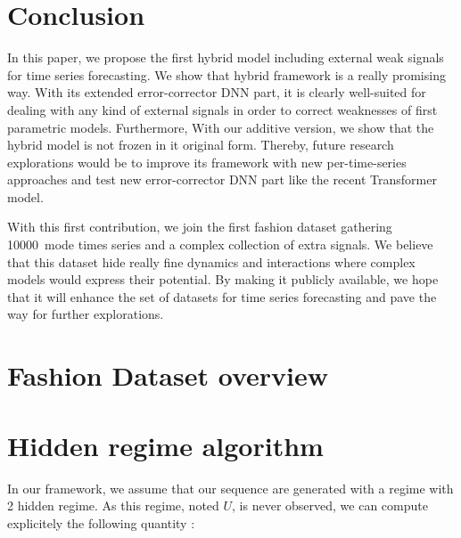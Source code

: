 \documentclass{article} %
\newcommand{\ts}{y}
\newcommand{\numberts}{10000}
\newcommand{\hiddenregime}{U}
\begin{document}
\section{Conclusion}
\label{sec:discussion}
In this paper, we propose the first hybrid model including external weak signals for time series forecasting. We show that hybrid framework is a really promising way. With its extended error-corrector DNN part, it is clearly well-suited for dealing with any kind of external signals in order to correct weaknesses of first parametric models. Furthermore, With our additive version, we show that the hybrid model is not frozen in it original form. Thereby, future research explorations would be to improve its framework with new per-time-series approaches and test new error-corrector DNN part like the recent Transformer model.

With this first contribution, we join the first fashion dataset gathering \numberts\ mode times series and a complex collection of extra signals. We believe that this dataset hide really fine dynamics and interactions where complex models would express their potential. By making it publicly available, we hope that it will enhance the set of datasets for time series forecasting and pave the way for further explorations.





\appendix

\section{Fashion Dataset overview}



\section{Hidden regime algorithm}

In our framework, we assume that our sequence are generated with a regime with 2 hidden regime. As this regime, noted $\hiddenregime$, is never observed, we can compute explicitely the following quantity : 



\end{document}
